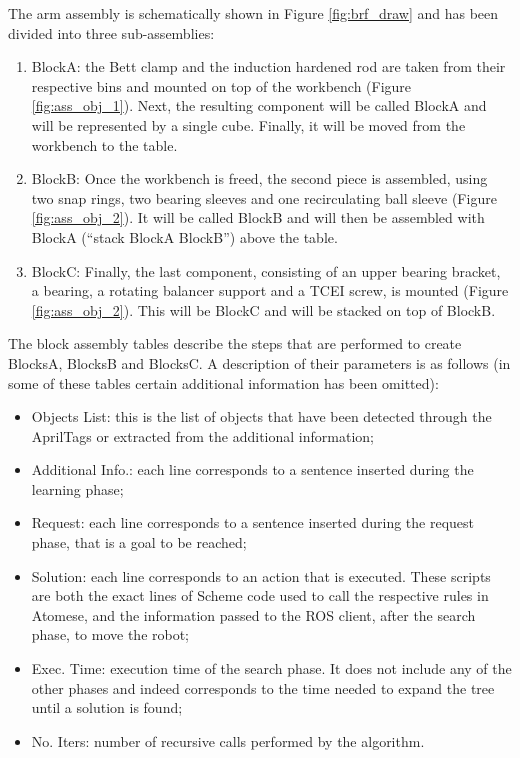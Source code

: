The arm assembly is schematically shown in Figure \ref{fig:brf_draw} and has been divided into three sub-assemblies:

\begin{enumerate}
	\item BlockA: the Bett clamp and the induction hardened rod are taken from their respective bins and mounted on top of the workbench (Figure \ref{fig:ass_obj_1}). Next, the resulting component will be called BlockA and will be represented by a single cube. Finally, it will be moved from the workbench to the table.

	\item BlockB: Once the workbench is freed, the second piece is assembled, using two snap rings, two bearing sleeves and one recirculating ball sleeve (Figure \ref{fig:ass_obj_2}). It will be called BlockB and will then be assembled with BlockA (\enquote{stack BlockA BlockB}) above the table.

	\item BlockC: Finally, the last component, consisting of an upper bearing bracket, a bearing, a rotating balancer support and a TCEI screw, is mounted (Figure \ref{fig:ass_obj_2}). This will be BlockC and will be stacked on top of BlockB.
\end{enumerate}

The block assembly tables describe the steps that are performed to create BlocksA, BlocksB and BlocksC. A description of their parameters is as follows
(in some of these tables certain additional information has been omitted\footnotemark{}):

\begin{itemize}
	\item Objects List: this is the list of objects that have been detected through the AprilTags or extracted from the additional information;
	\item Additional Info.: each line corresponds to a sentence inserted during the learning phase;
	\item Request: each line corresponds to a sentence inserted during the request phase, that is a goal to be reached;
	\item Solution: each line corresponds to an action that is executed. These scripts are both the exact lines of Scheme code used to call the respective rules in Atomese, and the information passed to the ROS client, after the search phase, to move the robot;
	\item Exec. Time: execution time of the search phase. It does not include any of the other phases and indeed corresponds to the time needed to expand the tree until a solution is found;
	\item No. Iters: number of recursive calls performed by the algorithm.
\end{itemize} 

